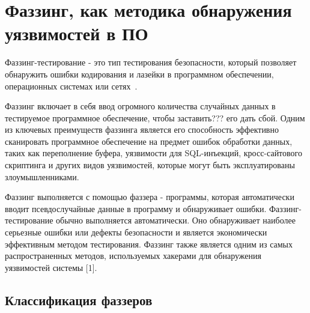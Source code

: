 \chapter{Фаззинг, как методика обнаружения уязвимостей в ПО} \label{ch1}


Фаззинг-тестирование - это тип тестирования безопасности, который позволяет обнаружить ошибки кодирования и лазейки в программном обеспечении, операционных системах или сетях~\cite{???}. 

Фаззинг включает в себя ввод огромного количества случайных данных в тестируемое программное обеспечение, чтобы заставить??? его дать сбой. Одним из ключевых преимуществ фаззинга является его способность эффективно сканировать программное обеспечение на предмет ошибок обработки данных, таких как переполнение буфера, уязвимости для SQL-инъекций, кросс-сайтового скриптинга и других видов уязвимостей, которые могут быть эксплуатированы злоумышленниками. 
\par

Фаззинг выполняется с помощью фаззера - программы, которая автоматически вводит псевдослучайные данные в программу и обнаруживает ошибки. Фаззинг-тестирование обычно выполняется автоматически. Оно обнаруживает наиболее серьезные ошибки или дефекты безопасности и является экономически эффективным методом тестирования. Фаззинг также является одним из самых распространенных методов, используемых хакерами для обнаружения уязвимостей системы [1].


\section{Классификация фаззеров} \label{ch1:sec1}



